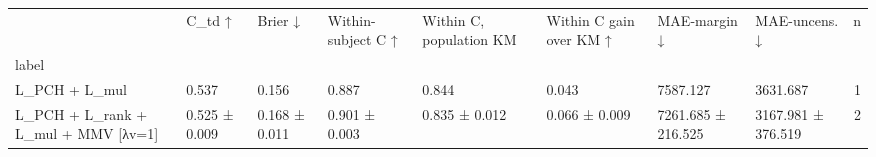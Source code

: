 \begin{tabular}{llllllllr}
\toprule
 & C\_td ↑ & Brier ↓ & Within-subject C ↑ & Within C, population KM & Within C gain over KM ↑ & MAE-margin ↓ & MAE-uncens. ↓ & n \\
label &  &  &  &  &  &  &  &  \\
\midrule
L\_PCH + L\_mul & 0.537 & 0.156 & 0.887 & 0.844 & 0.043 & 7587.127 & 3631.687 & 1 \\
L\_PCH + L\_rank + L\_mul + MMV [λv=1] & 0.525 ± 0.009 & 0.168 ± 0.011 & 0.901 ± 0.003 & 0.835 ± 0.012 & 0.066 ± 0.009 & 7261.685 ± 216.525 & 3167.981 ± 376.519 & 2 \\
\bottomrule
\end{tabular}
